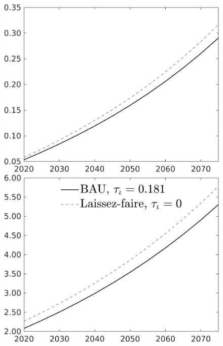 \documentclass[12pt]{article}
\begin{document}
\begin{figure}[h!!]
\begin{minipage}[]{0.32\textwidth}
	\end{minipage}	
	\begin{minipage}[]{0.32\textwidth}
		\includegraphics[width=1\textwidth]{../../codding_model/own_basedOnFried/optimalPol_010922_revision/figures/all_13Sept22/CompTaul_Equlab_LFBAU_Reg0_G_spillover0_nsk1_xgr0_knspil0_sep1_countec0_GovRev0_etaa0.79_lgd0.png}
	\end{minipage}	
	\begin{minipage}[]{0.32\textwidth}
		\includegraphics[width=1\textwidth]{../../codding_model/own_basedOnFried/optimalPol_010922_revision/figures/all_13Sept22/CompTaul_Equlab_LFBAU_Reg0_N_spillover0_nsk1_xgr0_knspil0_sep1_countec0_GovRev0_etaa0.79_lgd1.png}
	\end{minipage}	
\end{figure}
\end{document}
